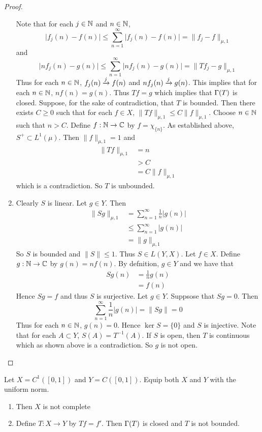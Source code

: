 \documentclass{book}
\begin{document}
\begin{proof}
\begin{enumerate}
			Note that for each $j \in \mathbb{N}$ and $n \in \mathbb{N}$, $$\vert f_j(n) - f(n) \vert \leq \sum_{n =1}^{\infty}\vert f_j(n) - f(n) \vert = \|f_j-f \|_{\mu, 1}$$ and $$\vert nf_j(n) - g(n) \vert \leq \sum_{n =1}^{\infty}\vert nf_j(n) - g(n) \vert = \|Tf_j - g\|_{\mu, 1}$$  
			Thus for each $n \in \mathbb{N}$, $f_j(n) \xrightarrow{j} f(n)$ and $nf_j(n) \xrightarrow{j} g(n)$. This implies that for each $n \in \mathbb{N}$, $nf(n) = g(n)$. Thus $Tf = g$ which implies that $\Gamma(T)$ is closed. Suppose, for the sake of contradiction, that $T$ is bounded. Then there exists $C \geq 0$ such that for each $f \in X$, $\|Tf \|_{\mu,1} \leq C \|f \|_{\mu, 1}$. Choose $n \in \mathbb{N}$ such that $n > C$. Define $f: \mathbb{N} \rightarrow \mathbb{C}$ by $f = \chi_{\{n\}}$. As established above, $S^+ \subset L^1(\mu)$. Then $\|f \|_{\mu,1} = 1$ and
			\begin{align*}
				\|Tf \|_{\mu,1}
				& = n \\
				&> C\\
				& = C \|f \|_{\mu,1}
			\end{align*}
			which is a contradiction. So $T$ is unbounded.
			\item Clearly $S$ is linear. Let $g \in Y$. Then \begin{align*}
				\|Sg \|_{\mu,1} 
				&= \sum_{n =1}^{\infty} \frac{1}{n} \vert g(n) \vert \\
				& \leq  \sum_{n =1}^{\infty} \vert g(n) \vert \\
				& = \|g \|_{\mu,1}
			\end{align*}
			So $S$ is bounded and $\|S \|\leq 1$. Thus $S \in L(Y,X)$. Let $f \in X$. Define $g: \mathbb{N} \rightarrow \mathbb{C}$ by $g(n) = nf(n)$. By defnition, $g \in Y$ and we have that
			\begin{align*}
				Sg(n) 
				&= \frac{1}{n}g(n) \\
				& = f(n)
			\end{align*}
			Hence $Sg =f$ and thus $S$ is surjective. Let $g \in Y$. Suppsose that $Sg = 0$. Then $$\sum_{n=1}^{\infty} \frac{1}{n}\vert g(n)\vert =\|Sg \| = 0$$ Thus for each $n \in \mathbb{N}$, $g(n) = 0$. Hence $\ker S = \{0\}$ and $S$ is injective. Note that for each $A \subset Y$, $S(A)= T^{-1}(A)$. If $S$ is open, then $T$ is continuous which as shown above is a contradiction. So $g$ is not open. 
		\end{enumerate}
	\end{proof}
	
	\begin{ex} \lex{}
		Let $X = C^1([0,1])$ and $Y=C([0,1])$. Equip both $X$ and $Y$ with the uniform norm. 
		\begin{enumerate}
			\item Then $X$ is not complete
			\item Define $T: X \rightarrow Y$ by $Tf = f'$. Then $\Gamma(T)$ is closed and $T$ is not bounded. 
		\end{enumerate}
	\end{ex}
	
\end{document}
